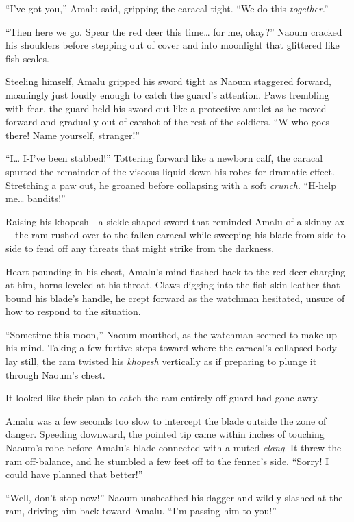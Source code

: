 ``I've got you,'' Amalu said, gripping the caracal tight. ``We do this \emph{together}.''

``Then here we go. Spear the red deer this time\ldots{} for me, okay?'' Naoum cracked his shoulders before stepping out of cover and into moonlight that glittered like fish scales.

Steeling himself, Amalu gripped his sword tight as Naoum staggered forward, moaningly just loudly enough to catch the guard's attention. Paws trembling with fear, the guard held his sword out like a protective amulet as he moved forward and gradually out of earshot of the rest of the soldiers. ``W-who goes there! Name yourself, stranger!''

``I\ldots{} I-I've been stabbed!'' Tottering forward like a newborn calf, the caracal spurted the remainder of the viscous liquid down his robes for dramatic effect. Stretching a paw out, he groaned before collapsing with a soft \emph{crunch}. ``H-help me\ldots{} bandits!''

Raising his khopesh---a sickle-shaped sword that reminded Amalu of a skinny ax---the ram rushed over to the fallen caracal while sweeping his blade from side-to-side to fend off any threats that might strike from the darkness.

Heart pounding in his chest, Amalu's mind flashed back to the red deer charging at him, horns leveled at his throat. Claws digging into the fish skin leather that bound his blade's handle, he crept forward as the watchman hesitated, unsure of how to respond to the situation.

``Sometime this moon,'' Naoum mouthed, as the watchman seemed to make up his mind. Taking a few furtive steps toward where the caracal's collapsed body lay still, the ram twisted his \emph{khopesh} vertically as if preparing to plunge it through Naoum's chest.

It looked like their plan to catch the ram entirely off-guard had gone awry.

Amalu was a few seconds too slow to intercept the blade outside the zone of danger. Speeding downward, the pointed tip came within inches of touching Naoum's robe before Amalu's blade connected with a muted \emph{clang}. It threw the ram off-balance, and he stumbled a few feet off to the fennec's side. ``Sorry! I could have planned that better!''

``Well, don't stop now!'' Naoum unsheathed his dagger and wildly slashed at the ram, driving him back toward Amalu. ``I'm passing him to you!''

